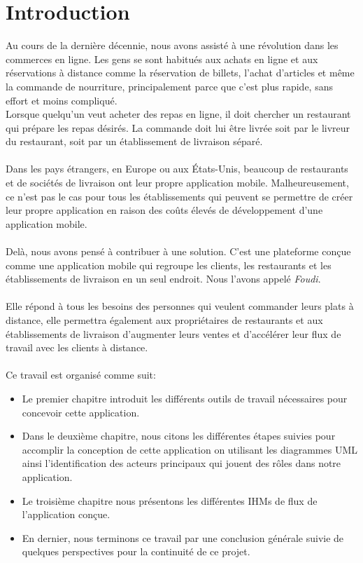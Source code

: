 \documentclass[french, a4paper, 12pt]{report}
\begin{document}
\newpage
\chapter*{Introduction}
    Au cours de la dernière décennie, nous avons assisté à une révolution dans les commerces en ligne. Les gens se sont habitués aux achats en ligne et aux réservations à distance comme la réservation de billets, l'achat d'articles et même la commande de nourriture, principalement parce que c'est plus rapide, sans effort et moins compliqué.\\

Lorsque quelqu'un veut acheter des repas en ligne, il doit chercher un restaurant qui prépare les repas désirés. La commande doit lui être livrée soit par le livreur du restaurant, soit par un établissement de livraison séparé.\\\\

Dans les pays étrangers, en Europe ou aux États-Unis, beaucoup de restaurants et de sociétés de livraison ont leur propre application mobile. Malheureusement, ce n'est pas le cas pour tous les établissements qui peuvent se permettre de créer leur propre application en raison des coûts élevés de développement d'une application mobile.\\\\

Delà, nous avons pensé à contribuer à une solution. C'est une plateforme conçue comme une application mobile qui regroupe les clients, les restaurants et les établissements de livraison en un seul endroit. Nous l'avons appelé \emph{Foudi}. \\\\

Elle répond à tous les besoins des personnes qui veulent commander leurs plats à distance, elle permettra également aux propriétaires de restaurants et aux établissements de livraison d'augmenter leurs ventes et d'accélérer leur flux de travail avec les clients à distance.\\\\

\newpage
Ce travail est organisé comme suit:
\begin{itemize}
	\item Le premier chapitre introduit les différents outils de travail nécessaires pour concevoir cette application.
	\item Dans le deuxième chapitre, nous citons les différentes étapes suivies pour accomplir la conception de cette application on utilisant les diagrammes UML ainsi l'identification des acteurs principaux qui jouent des rôles dans notre application.
	\item Le troisième chapitre nous présentons les différentes IHMs de flux de l'application conçue.
	\item En dernier, nous terminons ce travail par une conclusion générale suivie de quelques perspectives pour la continuité de ce projet.
\end{itemize}
\end{document}
